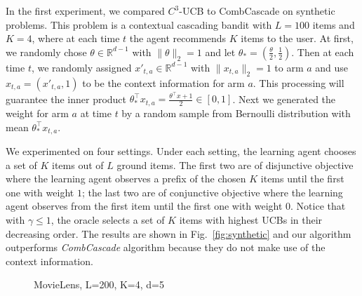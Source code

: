 \documentclass{article}
\newcommand{\RR}{\mathbb{R}}
\begin{document}
In the first experiment, we compared $C^3$-UCB to CombCascade on synthetic problems. This problem is a contextual cascading bandit with $L=100$ items and $K=4$, where at each time $t$ the agent recommends $K$ items to the user. At first, we randomly chose $\theta \in \RR^{d-1}$ with $\|\theta \|_2 = 1$ and let $\theta_* = (\frac{\theta}{2}, \frac{1}{2})$. Then at each time $t$, we randomly assigned $x'_{t,a} \in \RR^{d-1}$ with $\|x_{t,a}\|_2 = 1$ to arm $a$ and use $x_{t,a} = (x'_{t,a}, 1)$ to be the context information for arm $a$. This processing will guarantee the inner product $\theta_*^{\top}x_{t,a} = \frac{\theta^{\top}x + 1}{2} \in [0,1]$. Next we generated the weight for arm $a$ at time $t$ by a random sample from Bernoulli distribution with mean $\theta_*^{\top}x_{t,a}$.

We experimented on four settings. Under each setting, the learning agent chooses a set of $K$ items out of $L$ ground items. The first two are of disjunctive objective where the learning agent observes a prefix of the chosen $K$ items until the first one with weight $1$; the last two are of conjunctive objective where the learning agent observes from the first item until the first one with weight $0$. Notice that with $\gamma \leq 1$, the oracle selects a set of $K$ items with highest UCBs in their decreasing order. The results are shown in Fig.~\ref{fig:synthetic} and our algorithm outperforms {\it CombCascade} algorithm because they do not make use of the context information.

\begin{figure}
	\centering
	\caption{MovieLens, L=200, K=4, d=5}
	\label{fig:movielens} %
\end{figure}
\end{document}
